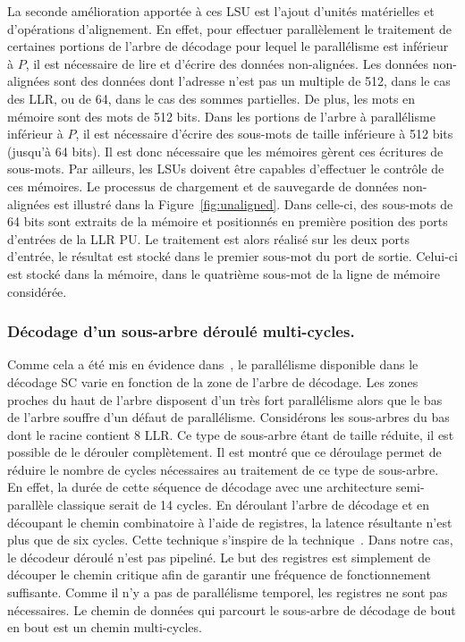 La seconde amélioration apportée à ces LSU est l'ajout d'unités matérielles et d'opérations d'alignement. En effet, pour effectuer parallèlement le traitement de certaines portions de l'arbre de décodage pour lequel le parallélisme est inférieur à $P$, il est nécessaire de lire et d'écrire des données non-alignées. Les données non-alignées sont des données dont l'adresse n'est pas un multiple de 512, dans le cas des LLR, ou de 64, dans le cas des sommes partielles. De plus, les mots en mémoire sont des mots de 512 bits. Dans les portions de l'arbre à parallélisme inférieur à $P$, il est nécessaire d'écrire des sous-mots de taille inférieure à 512 bits (jusqu'à 64 bits). Il est donc nécessaire que les mémoires gèrent ces écritures de sous-mots. Par ailleurs, les LSUs doivent être capables d'effectuer le contrôle de ces mémoires. Le processus de chargement et de sauvegarde de données non-alignées est illustré dans la Figure~\ref{fig:unaligned}. Dans celle-ci, des sous-mots de 64 bits sont extraits de la mémoire et positionnés en première position des ports d'entrées de la LLR PU. Le traitement est alors réalisé sur les deux ports d'entrée, le résultat est stocké dans le premier sous-mot du port de sortie. Celui-ci est stocké dans la mémoire, dans le quatrième sous-mot de la ligne de mémoire considérée.

\subsubsection{Décodage d'un sous-arbre déroulé multi-cycles.}

Comme cela a été mis en évidence dans~\cite{gal_scalable_2016}, le parallélisme disponible dans le décodage SC varie en fonction de la zone de l'arbre de décodage. Les zones proches du haut de l'arbre disposent d'un très fort parallélisme alors que le bas de l'arbre souffre d'un défaut de parallélisme. Considérons les sous-arbres du bas dont le \noeud racine contient 8 LLR. Ce type de sous-arbre étant de taille réduite, il est possible de le dérouler complètement. Il est montré que ce déroulage permet de réduire le nombre de cycles nécessaires au traitement de ce type de sous-arbre. En effet, la durée de cette séquence de décodage avec une architecture semi-parallèle classique serait de 14 cycles. En déroulant l'arbre de décodage et en découpant le chemin combinatoire à l'aide de registres, la latence résultante n'est plus que de six cycles. Cette technique s'inspire de la technique~\cite{giard_unrolled_2015}. Dans notre cas, le décodeur déroulé n'est pas pipeliné. Le but des registres est simplement de découper le chemin critique afin de garantir une fréquence de fonctionnement suffisante. Comme il n'y a pas de parallélisme temporel, les registres ne sont pas nécessaires. Le chemin de données qui parcourt le sous-arbre de décodage de bout en bout est un chemin multi-cycles.

